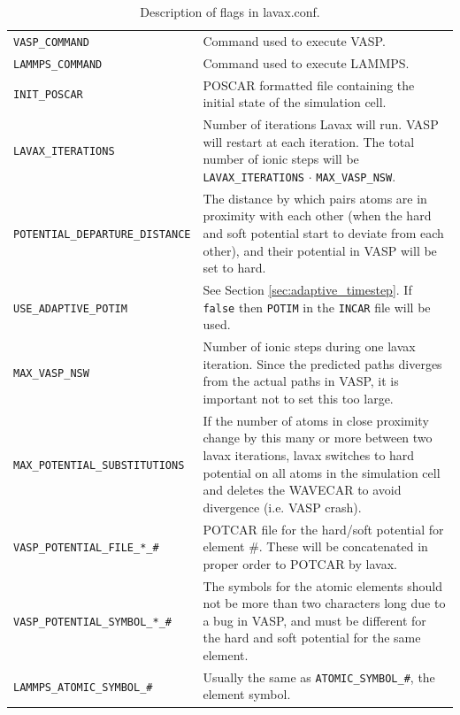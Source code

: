 \documentclass{article}
\begin{document}
\begin{table}[H]
\centering
\caption{Description of flags in lavax.conf.\label{tab:1}}
\begin{tabular}{lp{10cm}}
  \rowcolor{gray!25}
  \hline
  \texttt{VASP\_COMMAND} & Command used to execute VASP. \\
  \texttt{LAMMPS\_COMMAND} & Command used to execute LAMMPS. \\
  \texttt{INIT\_POSCAR} & POSCAR formatted file containing the initial state of the simulation cell. \\
  \texttt{LAVAX\_ITERATIONS} & Number of iterations Lavax will run. VASP will restart at each iteration. The total number of ionic steps will be \texttt{LAVAX\_ITERATIONS} $\cdot$ \texttt{MAX\_VASP\_NSW}. \\
  \texttt{POTENTIAL\_DEPARTURE\_DISTANCE} & The distance by which pairs atoms are in proximity with each other (when the hard and soft potential start to deviate from each other), and their potential in VASP will be set to hard. \\
  \texttt{USE\_ADAPTIVE\_POTIM} & See Section \ref{sec:adaptive_timestep}. If \texttt{false} then \texttt{POTIM} in the \texttt{INCAR} file will be used.\\
  \texttt{MAX\_VASP\_NSW} & Number of ionic steps during one lavax iteration. Since the predicted paths diverges from the actual paths in VASP, it is important not to set this too large. \\
  \texttt{MAX\_POTENTIAL\_SUBSTITUTIONS} & If the number of atoms in close proximity change by this many or more between two lavax iterations, lavax switches to hard potential on all atoms in the simulation cell and deletes the WAVECAR to avoid divergence (i.e. VASP crash). \\
  \texttt{VASP\_POTENTIAL\_FILE\_*\_\#} & POTCAR file for the hard/soft potential for element \#. These will be concatenated in proper order to POTCAR by lavax.\\
  \texttt{VASP\_POTENTIAL\_SYMBOL\_*\_\#} & The symbols for the atomic elements should not be more than two characters long due to a bug in VASP, and must be different for the hard and soft potential for the same element. \\
  \texttt{LAMMPS\_ATOMIC\_SYMBOL\_\#} & Usually the same as \texttt{ATOMIC\_SYMBOL\_\#}, the element symbol.\\
  \hline
\end{tabular}
\end{table}
\end{document}
